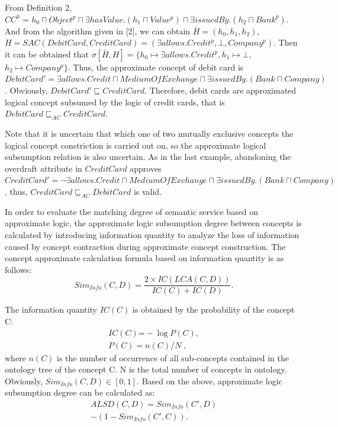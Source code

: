 \documentclass{ieeeaccess}
\begin{document}
From Definition 2, $C{{C}^{h}}={{h}_{0}}\sqcap Objec{{t}^{p}}\sqcap \exists hasValue.\left( {{h}_{1}}\sqcap Valu{{e}^{p}} \right)\sqcap \exists issuedBy.\left( {{h}_{2}}\sqcap Ban{{k}^{p}} \right)$.
And from the algorithm given in [2], we can obtain $\bar{H}=\left( {{h}_{0}},{{h}_{1}},{{h}_{2}} \right)$, $H=SAC\left( DebitCard,CreditCard \right)=\left( \exists allows.Credi{{t}^{p}},\bot ,Compan{{y}^{p}} \right)$.
Then it can be obtained that $\sigma[\bar{H},H]=\{ {{h}_{0}}\mapsto \exists allows.Credi{{t}^{p}},{{h}_{1}}\mapsto \bot$, ${{h}_{2}}\mapsto Company^{p} \}$. Thus, the approximate concept of debit card is $DebitCard'=\exists allows.Credit\sqcap MediumOfExchange\sqcap \exists issuedBy.\left( Bank\sqcap Company \right)$. Obviously, $DebitCard'\sqsubseteq CreditCard$. Therefore, debit cards are approximated logical concept subsumed by the logic of credit cards, that is $DebitCard{{\sqsubseteq }_{AC}}CreditCard$.

Note that it is uncertain that which one of two mutually exclusive concepts the logical concept constriction is carried out on, so the approximate logical subsumption relation is also uncertain. As in the last example, abandoning the overdraft attribute in $CreditCard$ approves $CreditCard'=\neg \exists allows.Credit\sqcap MediumOfExchange\sqcap \exists issuedBy.\left( Bank\sqcap Company \right)$, thus, $CreditCard{{\sqsubseteq }_{AC}}DebitCard$ is valid.

In order to evaluate the matching degree of semantic service based on approximate logic, the approximate logic subsumption degree between concepts is calculated by introducing information quantity \cite{lin1998information} to analyze the loss of information caused by concept contraction during approximate concept construction. The concept approximate calculation formula based on information quantity is as follows:
\begin{equation}
Si{{m}_{Info}}\left( C,D \right)=\frac{2\times IC\left( LCA\left( C,D \right) \right)}{IC\left( C \right)+IC\left( D \right)}.
\end{equation}
 
The information quantity $IC(C)$ \cite{amiri2016learning} is obtained by the probability of the concept C:
\begin{align}
IC\left( C \right)\text{=}-\log P\left( C \right),\nonumber\\
P\left( C \right)={n\left( C \right)}/{N}\;,
\end{align}
where $n(C)$ is the number of occurrence of all sub-concepts contained in the ontology tree of the concept C.
N is the total number of concepts in ontology.
Obviously, $Si{{m}_{Info}}\left( C,D \right)\in \left[ 0,1 \right]$.
Based on the above, approximate logic subsumption degree can be calculated as: 
\begin{align}
ALSD\left( C,D \right)=Si{{m}_{Info}}\left( C',D \right)\nonumber\\
-\left( 1-Si{{m}_{Info}}\left( C',C \right) \right).
\end{align}
\end{document}
